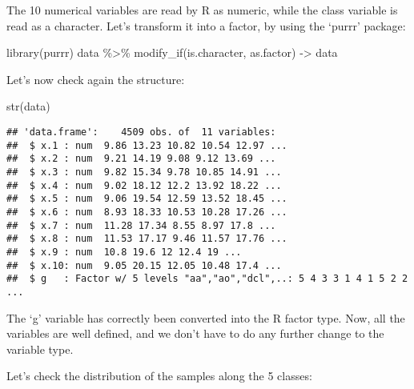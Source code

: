 \documentclass[
]{article}
\newenvironment{Shaded}{\begin{snugshade}}{\end{snugshade}}
\newcommand{\AttributeTok}[1]{\textcolor[rgb]{0.77,0.63,0.00}{#1}}
\newcommand{\FunctionTok}[1]{\textcolor[rgb]{0.00,0.00,0.00}{#1}}
\newcommand{\NormalTok}[1]{#1}
\newcommand{\OtherTok}[1]{\textcolor[rgb]{0.56,0.35,0.01}{#1}}
\newcommand{\SpecialCharTok}[1]{\textcolor[rgb]{0.00,0.00,0.00}{#1}}
\newcommand{\StringTok}[1]{\textcolor[rgb]{0.31,0.60,0.02}{#1}}
\begin{document}
The 10 numerical variables are read by R as numeric, while the class
variable is read as a character. Let's transform it into a factor, by
using the `purrr' package:

\begin{Shaded}
\begin{Highlighting}[]
\FunctionTok{library}\NormalTok{(purrr)}
\NormalTok{data }\SpecialCharTok{\%\textgreater{}\%} \FunctionTok{modify\_if}\NormalTok{(is.character, as.factor) }\OtherTok{{-}\textgreater{}}\NormalTok{ data}
\end{Highlighting}
\end{Shaded}

Let's now check again the structure:

\begin{Shaded}
\begin{Highlighting}[]
\FunctionTok{str}\NormalTok{(data)}
\end{Highlighting}
\end{Shaded}

\begin{verbatim}
## 'data.frame':    4509 obs. of  11 variables:
##  $ x.1 : num  9.86 13.23 10.82 10.54 12.97 ...
##  $ x.2 : num  9.21 14.19 9.08 9.12 13.69 ...
##  $ x.3 : num  9.82 15.34 9.78 10.85 14.91 ...
##  $ x.4 : num  9.02 18.12 12.2 13.92 18.22 ...
##  $ x.5 : num  9.06 19.54 12.59 13.52 18.45 ...
##  $ x.6 : num  8.93 18.33 10.53 10.28 17.26 ...
##  $ x.7 : num  11.28 17.34 8.55 8.97 17.8 ...
##  $ x.8 : num  11.53 17.17 9.46 11.57 17.76 ...
##  $ x.9 : num  10.8 19.6 12 12.4 19 ...
##  $ x.10: num  9.05 20.15 12.05 10.48 17.4 ...
##  $ g   : Factor w/ 5 levels "aa","ao","dcl",..: 5 4 3 3 1 4 1 5 2 2 ...
\end{verbatim}

The `g' variable has correctly been converted into the R factor type.
Now, all the variables are well defined, and we don't have to do any
further change to the variable type.

Let's check the distribution of the samples along the 5 classes:

\begin{Shaded}
\end{Shaded}
\end{document}
